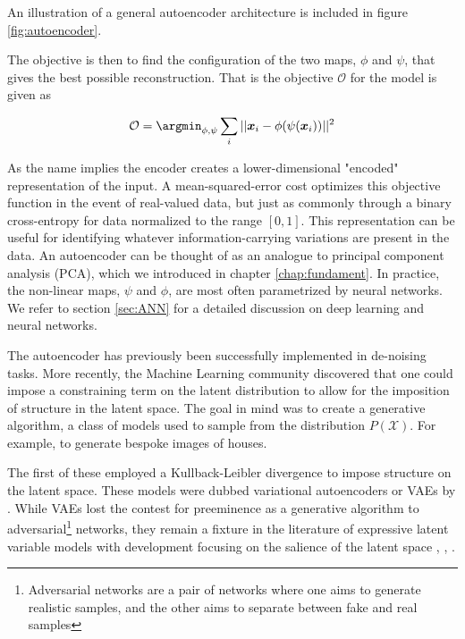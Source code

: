 \noindent An illustration of a general autoencoder architecture is included in figure \ref{fig:autoencoder}.

The objective is then to find the configuration of the two maps, $\phi$ and $\psi$, that gives the best possible reconstruction. That is the objective $\mathcal{O}$ for the model is given as

\begin{align}\label{eq:objective_autoenc}
  \mathcal{O} = \argmin_{\phi, \psi} \sum_i || \boldsymbol{x}_i - \phi(\psi( \boldsymbol{x}_i ))  ||^2
\end{align}

\noindent  As the name implies the encoder creates a lower-dimensional "encoded" representation of the input. A mean-squared-error cost optimizes this objective function in the event of real-valued data, but just as commonly through a binary cross-entropy for data normalized to the range $[0, 1]$. This representation can be useful for identifying whatever information-carrying variations are present in the data. An autoencoder can be thought of as an analogue to principal component analysis (PCA)\cite{Marsland2009}, which we introduced in chapter \ref{chap:fundament}. In practice, the non-linear maps, $\psi$ and $\phi$, are most often parametrized by neural networks. We refer to section \ref{sec:ANN} for a detailed discussion on deep learning and neural networks.

The autoencoder has previously been successfully implemented in de-noising tasks. More recently, the Machine Learning community discovered that one could impose a constraining term on the latent distribution to allow for the imposition of structure in the latent space. The goal in mind was to create a generative algorithm, a class of models used to sample from the distribution $P(\mathcal{X})$. For example, to generate bespoke images of houses. 

The first of these employed a Kullback-Leibler divergence to impose structure on the latent space. These models were dubbed variational autoencoders or VAEs by \citet{Kingma2013}. While VAEs lost the contest for preeminence as a generative algorithm to adversarial\footnote{Adversarial networks are a pair of networks where one aims to generate realistic samples, and the other aims to separate between fake and real samples} networks, they remain a fixture in the literature of expressive latent variable models with development focusing on the salience of the latent space \cite{Higgins2017}, \cite{Zhao}, \cite{Fertig}.

